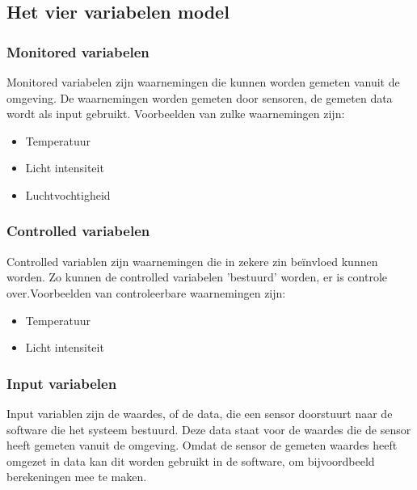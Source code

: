 \documentclass{article}%
\begin{document}
\subsection{Het vier variabelen model}

\subsubsection{Monitored variabelen}
Monitored variabelen zijn waarnemingen die kunnen worden gemeten vanuit de omgeving. De waarnemingen worden gemeten door sensoren, de gemeten data wordt als input gebruikt. Voorbeelden van zulke waarnemingen zijn:
\begin{itemize}
  \item Temperatuur
  \item Licht intensiteit
  \item Luchtvochtigheid
\end{itemize}

\subsubsection{Controlled variabelen}
Controlled variablen zijn waarnemingen die in zekere zin beïnvloed kunnen worden. Zo kunnen de controlled variabelen 'bestuurd' worden, er is controle over.Voorbeelden van controleerbare waarnemingen zijn:
\begin{itemize}
  \item Temperatuur
  \item Licht intensiteit
\end{itemize}

\subsubsection{Input variabelen}
Input variablen zijn de waardes, of de data, die een sensor doorstuurt naar de software die het systeem bestuurd. Deze data staat voor de waardes die de sensor heeft gemeten vanuit de omgeving. Omdat de sensor de gemeten waardes heeft omgezet in data kan dit worden gebruikt in de software, om bijvoordbeeld berekeningen mee te maken.
\end{document}
